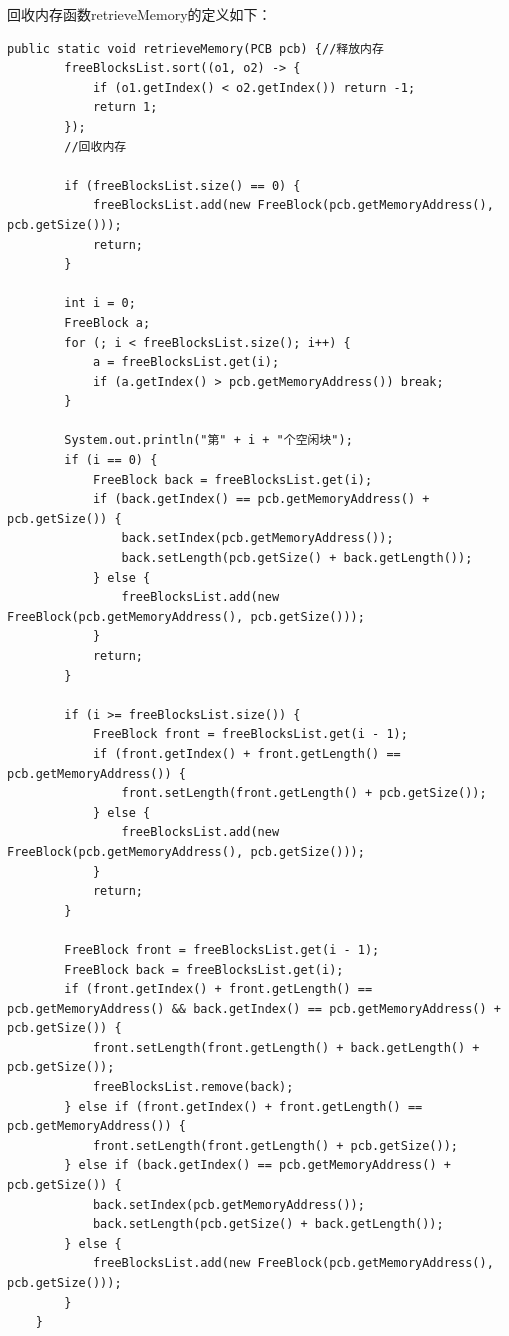 \documentclass[UTF8,12pt]{article}
\begin{document}
回收内存函数retrieveMemory的定义如下：
\begin{lstlisting}[title=回收内存函数定义,frame=shadowbox]
    public static void retrieveMemory(PCB pcb) {//释放内存
        freeBlocksList.sort((o1, o2) -> {
            if (o1.getIndex() < o2.getIndex()) return -1;
            return 1;
        });
        //回收内存

        if (freeBlocksList.size() == 0) {
            freeBlocksList.add(new FreeBlock(pcb.getMemoryAddress(), pcb.getSize()));
            return;
        }

        int i = 0;
        FreeBlock a;
        for (; i < freeBlocksList.size(); i++) {
            a = freeBlocksList.get(i);
            if (a.getIndex() > pcb.getMemoryAddress()) break;
        }

        System.out.println("第" + i + "个空闲块");
        if (i == 0) {
            FreeBlock back = freeBlocksList.get(i);
            if (back.getIndex() == pcb.getMemoryAddress() + pcb.getSize()) {
                back.setIndex(pcb.getMemoryAddress());
                back.setLength(pcb.getSize() + back.getLength());
            } else {
                freeBlocksList.add(new FreeBlock(pcb.getMemoryAddress(), pcb.getSize()));
            }
            return;
        }

        if (i >= freeBlocksList.size()) {
            FreeBlock front = freeBlocksList.get(i - 1);
            if (front.getIndex() + front.getLength() == pcb.getMemoryAddress()) {
                front.setLength(front.getLength() + pcb.getSize());
            } else {
                freeBlocksList.add(new FreeBlock(pcb.getMemoryAddress(), pcb.getSize()));
            }
            return;
        }

        FreeBlock front = freeBlocksList.get(i - 1);
        FreeBlock back = freeBlocksList.get(i);
        if (front.getIndex() + front.getLength() == pcb.getMemoryAddress() && back.getIndex() == pcb.getMemoryAddress() + pcb.getSize()) {
            front.setLength(front.getLength() + back.getLength() + pcb.getSize());
            freeBlocksList.remove(back);
        } else if (front.getIndex() + front.getLength() == pcb.getMemoryAddress()) {
            front.setLength(front.getLength() + pcb.getSize());
        } else if (back.getIndex() == pcb.getMemoryAddress() + pcb.getSize()) {
            back.setIndex(pcb.getMemoryAddress());
            back.setLength(pcb.getSize() + back.getLength());
        } else {
            freeBlocksList.add(new FreeBlock(pcb.getMemoryAddress(), pcb.getSize()));
        }
    }
\end{lstlisting}
\end{document}
